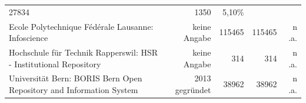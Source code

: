 \documentclass[a4paper,
fontsize=11pt,
oneside,
numbers=noperiodatend,
parskip=half-,
bibliography=totoc,
final
]{scrartcl}
\begin{document}
\begin{longtable}[c]{@{}lrrrr@{}}
\begin{minipage}[t]{0.16\columnwidth}\raggedleft\strut
27834
\strut\end{minipage} &
\begin{minipage}[t]{0.14\columnwidth}\raggedleft\strut
1350
\strut\end{minipage} &
\begin{minipage}[t]{0.14\columnwidth}\raggedleft\strut
5,10\%
\strut\end{minipage}\tabularnewline
\begin{minipage}[t]{0.25\columnwidth}\raggedright\strut
Ecole Polytechnique Fédérale Lausanne: Infoscience
\strut\end{minipage} &
\begin{minipage}[t]{0.16\columnwidth}\raggedleft\strut
keine Angabe
\strut\end{minipage} &
\begin{minipage}[t]{0.16\columnwidth}\raggedleft\strut
115465
\strut\end{minipage} &
\begin{minipage}[t]{0.14\columnwidth}\raggedleft\strut
115465
\strut\end{minipage} &
\begin{minipage}[t]{0.14\columnwidth}\raggedleft\strut
n .a.
\strut\end{minipage}\tabularnewline
\begin{minipage}[t]{0.25\columnwidth}\raggedright\strut
Hochschule für Technik Rapperswil: HSR - Institutional Repository
\strut\end{minipage} &
\begin{minipage}[t]{0.16\columnwidth}\raggedleft\strut
keine Angabe
\strut\end{minipage} &
\begin{minipage}[t]{0.16\columnwidth}\raggedleft\strut
314
\strut\end{minipage} &
\begin{minipage}[t]{0.14\columnwidth}\raggedleft\strut
314
\strut\end{minipage} &
\begin{minipage}[t]{0.14\columnwidth}\raggedleft\strut
n .a.
\strut\end{minipage}\tabularnewline
\begin{minipage}[t]{0.25\columnwidth}\raggedright\strut
Universität Bern: BORIS Bern Open Repository and Information System
\strut\end{minipage} &
\begin{minipage}[t]{0.16\columnwidth}\raggedleft\strut
2013 gegründet
\strut\end{minipage} &
\begin{minipage}[t]{0.16\columnwidth}\raggedleft\strut
38962
\strut\end{minipage} &
\begin{minipage}[t]{0.14\columnwidth}\raggedleft\strut
38962
\strut\end{minipage} &
\begin{minipage}[t]{0.14\columnwidth}\raggedleft\strut
n .a.
\strut\end{minipage}\tabularnewline
\bottomrule
\end{longtable}
\end{document}
